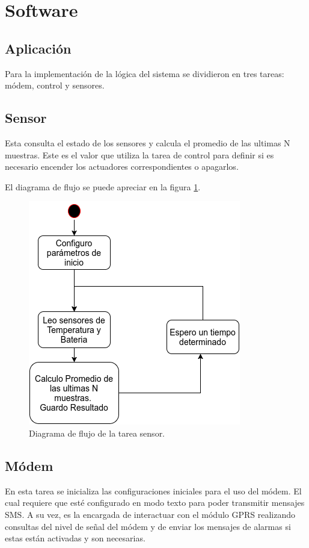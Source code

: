 \section{Software}
\subsection{Aplicación}
Para la implementación de la lógica del sistema se dividieron en tres tareas: módem, control y sensores. 

\subsection*{Sensor}

Esta consulta el estado de los sensores y calcula el promedio de las ultimas N muestras. Este es el valor que utiliza la tarea de control para definir si es necesario encender los actuadores correspondientes o apagarlos.

El diagrama de flujo se puede apreciar en la figura \ref{fig:sensor_task}.

\begin{figure}[!htp]
  \centering
  \includegraphics[scale=.7]{./Figures/sensor_task.png}
  \caption{Diagrama de flujo de la tarea sensor.}
  \label{fig:sensor_task}
\end{figure}


\subsection*{Módem}
  En esta tarea se inicializa las configuraciones iniciales para el uso del módem. El cual requiere que esté configurado en modo texto para poder transmitir mensajes SMS. A su vez, es la encargada de interactuar con el módulo GPRS realizando consultas del nivel de señal del módem y de enviar los mensajes de alarmas si estas están activadas y son necesarias.

